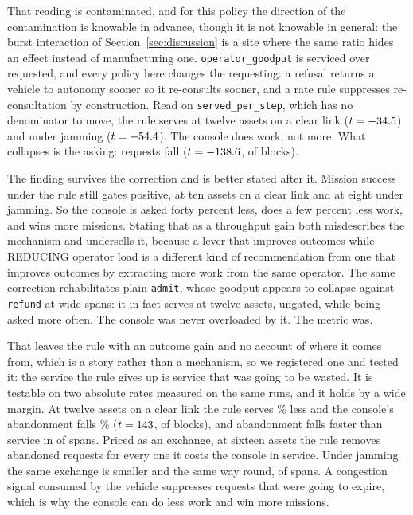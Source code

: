\documentclass[11pt]{article}
\begin{document}
That reading is contaminated, and for this policy the direction of the contamination is knowable in advance, though it is not knowable in general: the burst interaction of Section~\ref{sec:discussion} is a site where the same ratio hides an effect instead of manufacturing one. \texttt{operator\_goodput} is serviced over requested, and every policy here changes the requesting: a refusal returns a vehicle to autonomy sooner so it re-consults sooner, and a rate rule suppresses re-consultation by construction. Read on \texttt{served\_per\_step}, which has no denominator to move, the rule serves \rtServedAimdOverAdmitClearTwelve{} at twelve assets on a clear link ($t = -34.5{}$) and \rtServedAimdOverAdmitJamTwelve{} under jamming ($t = -54.4{}$). The console does \rtAimdWorkVerdict{} work, not more. What collapses is the asking: requests fall \rtAskedAimdOverAdmitClearTwelve{} ($t = -138.6{}$, \rtAskedAimdOverAdmitClearTwelveBlocks{} of \rtBlocks{} blocks).

The finding survives the correction and is better stated after it. Mission success under the rule still gates positive, \aiSuccClearGainTen{} at ten assets on a clear link and \aiSuccJamGainEight{} at eight under jamming. So the console is asked forty percent less, does a few percent less work, and wins more missions. Stating that as a throughput gain both misdescribes the mechanism and undersells it, because a lever that improves outcomes while REDUCING operator load is a different kind of recommendation from one that improves outcomes by extracting more work from the same operator. The same correction rehabilitates plain \texttt{admit}, whose goodput appears to collapse against \texttt{refund} at wide spans: it in fact serves \rtServedAdmitOverRefundClearTwelve{} at twelve assets, ungated, while being asked \rtAskedAdmitOverRefundClearTwelve{} more often. The console was never overloaded by it. The metric was.

That leaves the rule with an outcome gain and no account of where it comes from, which is a story rather than a mechanism, so we registered one and tested it: the service the rule gives up is service that was going to be wasted. It is testable on two absolute rates measured on the same runs, and it holds by a wide margin. At twelve assets on a clear link the rule serves \abClearNTwelveSrv\% less and the console's abandonment falls \abClearNTwelveAba\% ($t = 143{}$, \abClearBlocks{} of \abClearBlocks{} blocks), and abandonment falls faster than service in \abClearRelMore{} of \abClearRelCells{} spans. Priced as an exchange, at sixteen assets the rule removes \abClearRateHi{} abandoned requests for every one it costs the console in service. Under jamming the same exchange is smaller and the same way round, \abJamRelMore{} of \abJamRelCells{} spans. A congestion signal consumed by the vehicle suppresses requests that were going to expire, which is why the console can do less work and win more missions.
\end{document}
